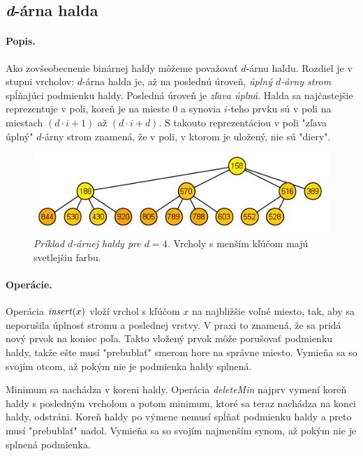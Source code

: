 \def\find{\mathop{\mathit{find}}}
\def\delete{\mathop{\mathit{delete}}}

\subsection{\emph{d}-árna halda} 
\paragraph{Popis.}
Ako zovšeobecnenie binárnej haldy môžeme považovať $d$-árnu haldu. Rozdiel je v stupni vrcholov:
$d$-árna halda je, až na poslednú úroveň, \emph{úplný $d$-árny strom} spĺňajúci podmienku haldy. Posledná úroveň je 
\emph{zľava úplná}.
Halda sa najčastejšie reprezentuje v poli, koreň je na mieste $0$ a synovia $i$-teho prvku sú v poli na miestach 
$(d\cdot i + 1)$ až $(d\cdot i + d)$.
S takouto reprezentáciou v poli "zľava úplný" $d$-árny strom znamená, že v poli, v ktorom je uložený, nie sú "diery". 

\begin{figure}
\includegraphics[width=\columnwidth]{obrazky/daryheap.png}
\caption{\emph{Príklad $d$-árnej haldy pre $d = 4$.} Vrcholy s menším kľúčom majú svetlejšiu farbu.} 
\label{img:komp} 
\end{figure}

\paragraph{Operácie.}
Operácia $\mathop{\mathit{insert}}(x)$ vloží vrchol s kľúčom $x$ na najbližšie voľné miesto, tak, aby sa neporušila úplnosť stromu 
a poslednej vrstvy. V praxi to znamená, že sa pridá nový prvok na koniec poľa. Takto vložený prvok môže porušovať 
podmienku haldy, takže ešte musí "prebublať" smerom hore na správne miesto. Vymieňa sa so svojím otcom, až pokým 
nie je podmienka haldy splnená.

Minimum sa nachádza v koreni haldy. Operácia \emph{deleteMin} najprv vymení koreň haldy s posledným vrcholom a potom 
minimum, ktoré sa teraz nachádza na konci haldy, odstráni. Koreň haldy po výmene nemusí spĺňať podmienku haldy a 
preto musí "prebublať" nadol. Vymieňa sa so svojím najmenším synom, až pokým nie je splnená podmienka.

